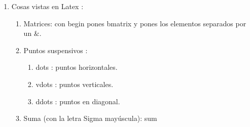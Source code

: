 \documentclass{article}
\begin{document}
\begin{enumerate}
		\item Cosas vistas en Latex :
		\begin{enumerate}
			\item Matrices: con begin pones bmatrix y pones los elementos separados por un $\&$. 
			\item Puntos suspensivos :
			\begin{enumerate}
				\item dots : puntos horizontales.
				\item vdots : puntos verticales.
				\item ddots : puntos en diagonal. 
			\end{enumerate} 
			\item Suma (con la letra Sigma mayúscula): sum 
		\end{enumerate}
	\end{enumerate}
\end{document}
